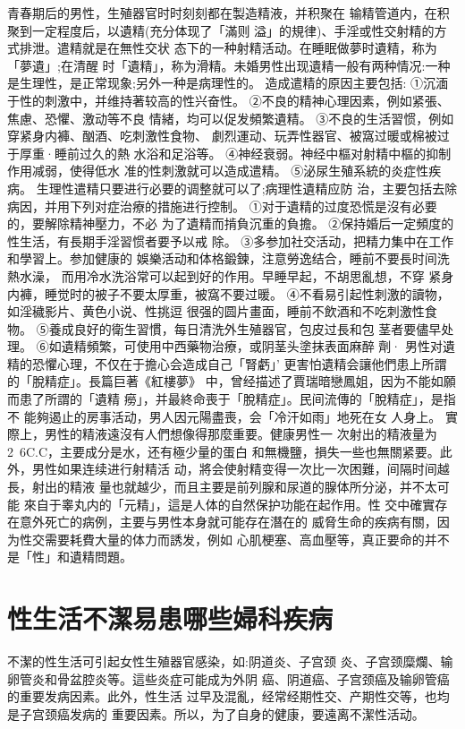 \documentclass[12pt,UTF8]{ctexbook}
\begin{document}
青春期后的男性，生殖器官时时刻刻都在製造精液，并积聚在
输精管道内，在积聚到一定程度后，以遺精(充分体现了「滿则
溢」的規律)、手淫或性交射精的方式排泄。遣精就是在無性交状
态下的一种射精活动。在睡眠做夢时遺精，称为「夢遺」;在清醒
时「遺精」，称为滑精。未婚男性出现遺精一般有两种情况:一种
是生理性，是正常现象;另外一种是病理性的。
造成遣精的原因主要包括:
①沉湎于性的刺激中，并维持著较高的性兴奋性。
②不良的精神心理因素，例如紧張、焦慮、恐懼、激动等不良
情緒，均可以促发頻繁遺精。
③不良的生活習惯，例如穿紧身内褲、酗酒、吃刺激性食物、
劇烈運动、玩弄性器官、被窩过暖或棉被过于厚重·睡前过久的熱
水浴和足浴等。
④神经衰弱。神经中樞对射精中樞的抑制作用减弱，使得低水
准的性刺激就可以造成遣精。
⑤泌尿生殖系統的炎症性疾病。
生理性遣精只要进行必要的调整就可以了;病理性遺精应防
治，主要包括去除病因，并用下列对症治療的措施进行控制。
①对于遺精的过度恐慌是沒有必要的，要解除精神壓力，不必
为了遺精而掯負沉重的負擔。
②保持婚后一定頻度的性生活，有長期手淫習惯者要予以戒
除。
③多参加社交活动，把精力集中在工作和學習上。参加健康的
娛樂活动和体格鍛鍊，注意勞逸结合，睡前不要長时间洗熱水澡，
而用冷水洗浴常可以起到好的作用。早睡早起，不胡思亂想，不穿
紧身内褲，睡觉时的被子不要太厚重，被窩不要过暖。
④不看易引起性刺激的讀物，如淫穢影片、黄色小说、性挑逗
很强的圆片畫面，睡前不飲酒和不吃刺激性食物。
⑤養成良好的衛生習慣，每日清洗外生殖器官，包皮过長和包
茎者要儘早处理。
⑥如遺精頻繁，可使用中西藥物治療，或阴茎头塗抹表面麻醉
劑·
男性对遺精的恐懼心理，不仅在于擔心会造成自己「腎虧」’
更害怕遺精会讓他們患上所謂的「脫精症」。長篇巨著《紅樓夢》
中，曾经描述了賈瑞暗戀鳳姐，因为不能如願而患了所謂的「遺精
癆」，并最終命喪于「脫精症」。民间流傳的「脫精症」，是指不
能夠遏止的房事活动，男人因元陽盡喪，会「冷汗如雨」地死在女
人身上。
實際上，男性的精液遠沒有人們想像得那麼重要。健康男性一
次射出的精液量为2~6C.C，主要成分是水，还有極少量的蛋白
和無機鹽，損失一些也無關紧要。此外，男性如果连续进行射精活
动，將会使射精变得一次比一次困難，间隔时间越長，射出的精液
量也就越少，而且主要是前列腺和尿道的腺体所分泌，并不太可能
來自于睾丸内的「元精」，這是人体的自然保护功能在起作用。性
交中確實存在意外死亡的病例，主要与男性本身就可能存在潛在的
威脅生命的疾病有關，因为性交需要耗費大量的体力而誘发，例如
心肌梗塞、高血壓等，真正要命的并不是「性」和遺精問題。

\section{性生活不潔易患哪些婦科疾病}

不潔的性生活可引起女性生殖器官感染，如:阴道炎、子宫颈
炎、子宫颈糜爛、输卵管炎和骨盆腔炎等。這些炎症可能成为外阴
癌、阴道癌、子宫颈癌及输卵管癌的重要发病因素。此外，性生活
过早及混亂，经常经期性交、产期性交等，也均是子宫颈癌发病的
重要因素。所以，为了自身的健康，要遠离不潔性活动。
\end{document}
